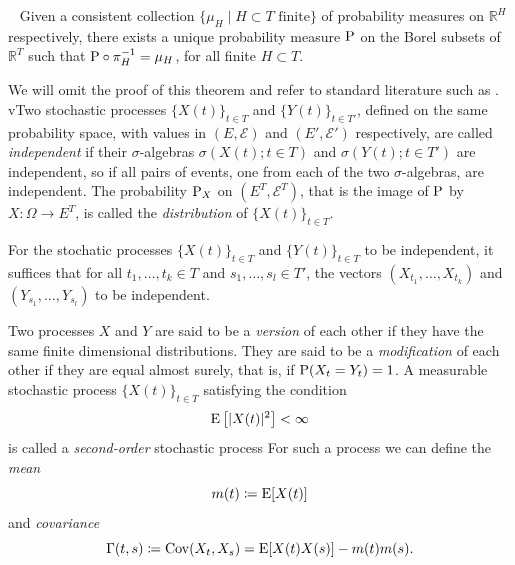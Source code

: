 \begin{theorem}~\label{thm:kolmogorov_extension_theorem}
    Given a consistent collection \( \{\mu_{H} \mid H \subset T \text{ finite}\} \) of probability measures on \( \mathbb{R}^{H} \) respectively, there exists a unique probability measure $\mathrm{P}$ on the Borel subsets of \( \mathbb{R}^{T} \) such that \( \mathrm{P} \circ \pi^{-1}_{H} = \mu_{H} \), for all finite \( H \subset T \).
\end{theorem}
We will omit the proof of this theorem and refer to standard literature such as \cite{tao2011introduction,bremaud2020probability}.
vTwo stochastic processes \( \{X(t)\}_{t \in T} \) and \( \{Y(t)\}_{t \in T'} \), defined on the same probability space, with values in \( (E,\mathcal{E}) \) and \( (E',\mathcal{E}') \) respectively, are called \textit{independent} if their $\sigma$-algebras \( \sigma(X(t); t \in T) \) and \( \sigma(Y(t); t \in T') \) are independent, so if all pairs of events, one from each of the two $\sigma$-algebras, are independent.
The probability \( \mathrm{P}_{X} \) on \( (E^{T}, \mathcal{E}^{T}) \), that is the image of $\mathrm{P}$ by \( X \colon \Omega \to E^{T} \), is called the \textit{distribution} of \( \{X(t)\}_{t \in T} \).

\begin{proposition}
    For the stochatic processes \( \{X(t)\}_{t \in T} \) and \( \{Y(t)\}_{t \in T} \) to be independent, it suffices that for all \( t_{1}, \dots, t_{k} \in T \) and \( s_{1}, \dots, s_{l} \in T' \), the vectors \( (X_{t_{1}}, \dots, X_{t_{k}}) \) and \( (Y_{s_{1}}, \dots, Y_{s_{l}}) \) to be independent.
\end{proposition}
Two processes $X$ and $Y$ are said to be a \textit{version} of each other if they have the same finite dimensional distributions. 
They are said to be a \textit{modification} of each other if they are equal almost surely, that is, if \( \mathrm{P}(X_{t} = Y_{t}) = 1 \).
A measurable stochastic process \( \{X(t)\}_{t \in T} \) satisfying the condition
\[
    \operatorname*{E}\left[ \lvert X(t) \rvert^2\right] < \infty
\]
is called a \textit{second-order} stochastic process
For such a process we can define the \textit{mean}
\[
    m(t) \coloneqq \operatorname*{E}[X(t)]
\]
and \textit{covariance}
\[
    \Gamma(t,s) \coloneqq \operatorname{Cov}(X_{t},X_{s}) = \operatorname*{E}[X(t)X(s)] - m(t)m(s).
\]


